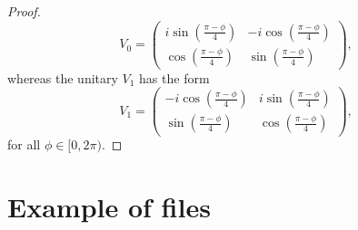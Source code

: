 \documentclass[preprint,12pt, a4paper, dvipsnames]{elsarticle}
\newcommand{\1}{{\rm 1\hspace{-0.9mm}l}}
\begin{document}
\begin{proof}
	\begin{equation}
	V_0 = \left(
	\begin{array}{cc}i \sin\left( \frac{\pi - \phi}{4} \right)&-i
	\cos\left( \frac{\pi - \phi}{4} \right)\\ \cos\left( \frac{\pi -
		\phi}{4}\right)& \sin\left( \frac{\pi - \phi}{4} \right)
	\end{array}
	\right),
	\end{equation}
	whereas the unitary  $V_1$  has the form
	\begin{equation}
	V_1 = \left(\begin{array}{cc}-i \cos\left(\frac{\pi - \phi}{4}\right) &i
	\sin\left( \frac{\pi - \phi}{4}\right)\\\sin\left( \frac{\pi - \phi}{4}
	\right) &  \cos\left( \frac{\pi - \phi}{4} \right) \end{array}\right),
	\end{equation}
	for all $\phi \in [0,2\pi)$.
\end{proof}


\section{Example of files} \label{app:example}
\end{document}
